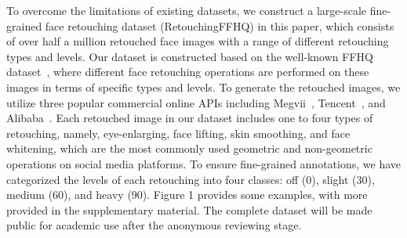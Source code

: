 \documentclass[sigconf]{acmart}
\begin{document}

To overcome the limitations of existing datasets, we construct a large-scale fine-grained face retouching dataset (RetouchingFFHQ) in this paper, which consists of over half a million retouched face images with a range of different retouching types and levels. Our dataset is constructed based on the well-known FFHQ dataset~\cite{FFHQ}, where different face retouching operations are performed on these images in terms of specific types and levels. To generate the retouched images, we utilize three popular commercial online APIs including Megvii~\cite{Megvii}, Tencent~\cite{Tencent}, and Alibaba~\cite{Alibaba}. Each retouched image in our dataset includes one to four types of retouching, namely, eye-enlarging, face lifting, skin smoothing, and face whitening, which are the most commonly used geometric and non-geometric operations on social media platforms. To ensure fine-grained annotations, we have categorized the levels of each retouching into four classes: off (0), slight (30), medium (60), and heavy (90). Figure 1 provides some examples, with more provided in the supplementary material.
The complete dataset will be made public for academic use after the anonymous reviewing stage.
\end{document}
